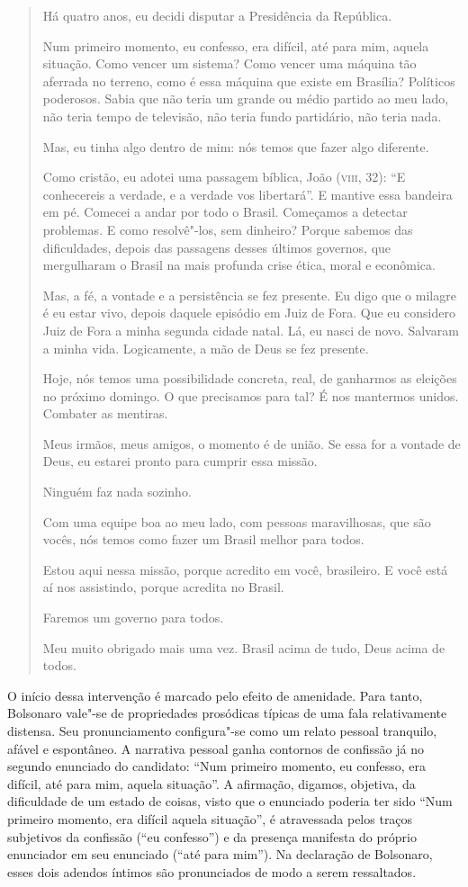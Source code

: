 \begin{quote}
Há quatro anos, eu decidi disputar a Presidência da República.

Num primeiro momento, eu confesso, era difícil, até para mim, aquela
situação. Como vencer um sistema? Como vencer uma máquina tão aferrada
no terreno, como é essa máquina que existe em Brasília? Políticos
poderosos. Sabia que não teria um grande ou médio partido ao meu lado,
não teria tempo de televisão, não teria fundo partidário, não teria
nada.

Mas, eu tinha algo dentro de mim: nós temos que fazer algo diferente.

Como cristão, eu adotei uma passagem bíblica, João (\textsc{viii}, 32): ``E
conhecereis a verdade, e a verdade vos libertará''. E mantive essa
bandeira em pé. Comecei a andar por todo o Brasil. Começamos a detectar
problemas. E como resolvê"-los, sem dinheiro? Porque sabemos das
dificuldades, depois das passagens desses últimos governos, que
mergulharam o Brasil na mais profunda crise ética, moral e econômica.

Mas, a fé, a vontade e a persistência se fez presente. Eu digo que o
milagre é eu estar vivo, depois daquele episódio em Juiz de Fora. Que eu
considero Juiz de Fora a minha segunda cidade natal. Lá, eu nasci de
novo. Salvaram a minha vida. Logicamente, a mão de Deus se fez presente.

Hoje, nós temos uma possibilidade concreta, real, de ganharmos as
eleições no próximo domingo. O que precisamos para tal? É nos mantermos
unidos. Combater as mentiras.

Meus irmãos, meus amigos, o momento é de união. Se essa for a vontade de
Deus, eu estarei pronto para cumprir essa missão.

Ninguém faz nada sozinho.

Com uma equipe boa ao meu lado, com pessoas maravilhosas, que são vocês,
nós temos como fazer um Brasil melhor para todos.

Estou aqui nessa missão, porque acredito em você, brasileiro. E você
está aí nos assistindo, porque acredita no Brasil.

Faremos um governo para todos.

Meu muito obrigado mais uma vez. Brasil acima de tudo, Deus acima de
todos.
\end{quote}

O início dessa intervenção é marcado pelo efeito de amenidade. Para
tanto, Bolsonaro vale"-se de propriedades prosódicas típicas de uma fala
relativamente distensa. Seu pronunciamento configura"-se como um relato
pessoal tranquilo, afável e espontâneo. A narrativa pessoal ganha
contornos de confissão já no segundo enunciado do candidato: ``Num
primeiro momento, eu confesso, era difícil, até para mim, aquela
situação''. A afirmação, digamos, objetiva, da dificuldade de um estado
de coisas, visto que o enunciado poderia ter sido ``Num primeiro
momento, era difícil aquela situação'', é atravessada pelos traços
subjetivos da confissão (``eu confesso'') e da presença manifesta do
próprio enunciador em seu enunciado (``até para mim''). Na declaração de
Bolsonaro, esses dois adendos íntimos são pronunciados de modo a serem
ressaltados.

